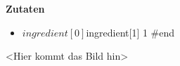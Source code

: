 \documentclass[10pt,a4paper]{article}
\begin{document}
	\begin{minipage}{0.4\textwidth}
	\textbf{Zutaten}
	\begin{itemize}
		#foreach( $ingredient in $ingredientList )
   			\item{$ingredient[0] $ingredient[1]} {1}
		#end
	\end{itemize}
	\end{minipage}
	\hfill
	\begin{minipage}{0.4\textwidth}
		<Hier kommt das Bild hin>
	\end{minipage}
\end{document}
